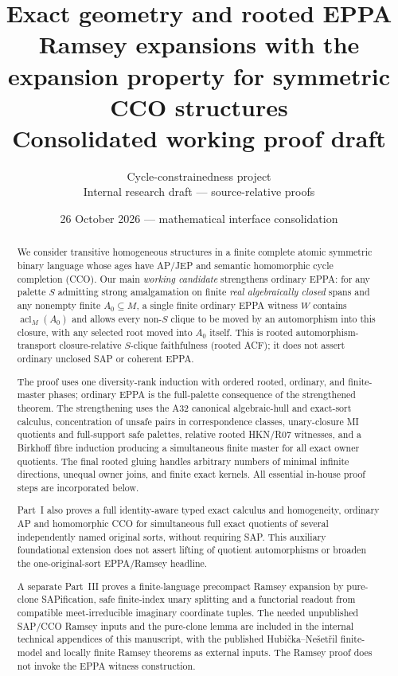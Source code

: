 \documentclass[11pt,a4paper]{article}
\title{Exact geometry and rooted EPPA\\\large Ramsey expansions with the expansion property for symmetric CCO structures\\
\large Consolidated working proof draft}
\author{Cycle-constrainedness project\\\normalsize Internal research draft --- source-relative proofs}
\date{26 October 2026 --- mathematical interface consolidation}
\theoremstyle{remark}\newtheorem{remark}[theorem]{Remark}
\theoremstyle{definition}
\theoremstyle{remark}
\begin{document}
\maketitle
\begin{abstract}
We consider transitive homogeneous structures in a finite complete
atomic symmetric binary language whose ages have AP/JEP and semantic
homomorphic cycle completion (CCO).  Our main \emph{working candidate}
strengthens ordinary EPPA: for any palette \(S\) admitting strong
amalgamation on finite \emph{real algebraically closed} spans and
any nonempty finite \(A_0\subseteq M\), a single finite ordinary
EPPA witness \(W\) contains \(\operatorname{acl}_M(A_0)\) and allows
every non-\(S\) clique to be moved by an automorphism into this
closure, with any selected root moved into \(A_0\) itself.
This is rooted automorphism-transport closure-relative
\(S\)-clique faithfulness (rooted ACF); it does not assert
ordinary unclosed SAP or coherent EPPA.

The proof uses one diversity-rank induction with ordered
rooted, ordinary, and finite-master phases; ordinary EPPA
is the full-palette consequence of the strengthened theorem.  The strengthening uses the
A32 canonical algebraic-hull and exact-sort calculus, concentration
of unsafe pairs in correspondence classes, unary-closure MI
quotients and full-support safe palettes, relative rooted
HKN/R07 witnesses, and a Birkhoff fibre induction producing a
simultaneous finite master for all exact owner quotients.
The final rooted gluing handles arbitrary numbers of minimal
infinite directions, unequal owner joins, and finite exact kernels.
All essential in-house proof steps are incorporated below.

Part~I also proves a full identity-aware typed exact calculus and
homogeneity, ordinary AP and homomorphic CCO for simultaneous full
exact quotients of several independently named original sorts,
without requiring SAP. This auxiliary foundational extension does
not assert lifting of quotient automorphisms or broaden the
one-original-sort EPPA/Ramsey headline.

A separate Part~III proves a finite-language precompact Ramsey expansion
by pure-clone SAPification, safe finite-index unary splitting and a
functorial readout from compatible meet-irreducible imaginary coordinate
tuples. The needed unpublished SAP/CCO Ramsey inputs and the pure-clone
lemma are included in the internal technical appendices of this manuscript,
with the published Hubi\v{c}ka--Ne\v{s}et\v{r}il finite-model and
locally finite Ramsey theorems as external inputs. The Ramsey proof does
not invoke the EPPA witness construction.


\end{abstract}
\end{document}
